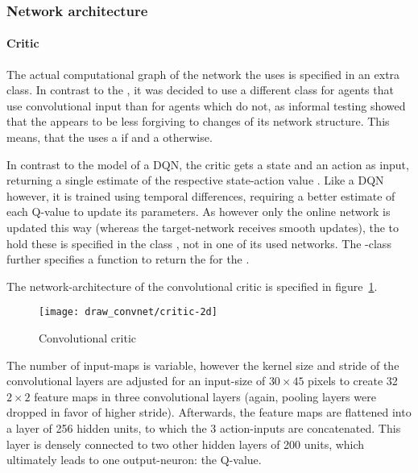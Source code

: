 \subsubsection{Network architecture}

\paragraph{Critic}

The actual computational graph of the network the  uses is specified in an extra class. In contrast to the , it was decided to use a different class for agents that use convolutional input than for agents which do not, as informal testing showed that the  appears to be less forgiving to changes of its network structure. This means, that the  uses a  if  and a  otherwise.

In contrast to the model of a DQN, the critic gets a state and an action as input, returning a single estimate of the respective state-action value . Like a DQN however, it is trained using temporal differences, requiring a better estimate of each Q-value to update its parameters. As however only the online network is updated this way (whereas the target-network receives smooth updates), the  to hold these is specified in the class , not in one of its used networks. The -class further specifies a function to return the  for the .

The network-architecture of the convolutional critic is specified in figure~\ref{fig:2dcrit}. 

\begin{figure}[h]
	\centering 
	\texttt{[image: draw\_convnet/critic-2d]}
	\caption{Convolutional critic}
	\label{fig:2dcrit}
\end{figure}

The number of input-maps is variable, however the kernel size and stride of the convolutional layers are adjusted for an input-size of $30\times45$ pixels to create 32 $2\times2$ feature maps in three convolutional layers (again, pooling layers were dropped in favor of higher stride).  Afterwards, the feature maps are flattened into a layer of 256 hidden units, to which the 3 action-inputs are concatenated. This layer is densely connected to two other hidden layers of 200 units, which ultimately leads to one output-neuron: the Q-value.\\

